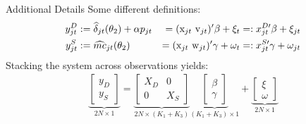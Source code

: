 \documentclass[aspectratio=169,10pt]{beamer}
\begin{document}
\begin{frame}{Additional Details}
Some different definitions:
\begin{alignat}{3}
\label{eq:stacked}
\nonumber y_{jt}^D &:= \widehat \delta_{jt}(\theta_2) + \alpha p_{jt} &=(\textrm{x}_{jt} \-\ \textrm{v}_{jt})' \beta + \xi_t &=: x_{jt}^{D\prime}\beta + \xi_{jt} \\ 
y_{jt}^S &:= \widehat{mc}_{jt}(\theta_2) &= (\textrm{x}_{jt} \-\ \textrm{w}_{jt})'\gamma + \omega_t &=: x_{jt}^{S\prime} \gamma + \omega_{jt} 
\end{alignat}
Stacking the system across observations yields:
\begin{align}
\underbrace{\begin{bmatrix} y_D \\ y_S \end{bmatrix}}_{2N\times1} = 
\underbrace{\begin{bmatrix}
X_D & 0 \\
0 & X_S 
\end{bmatrix}}_{2N\times(K_1+K_3)}
\underbrace{\begin{bmatrix}
\beta \\ \gamma %
\end{bmatrix}}_{(K_1+K_3)\times1} + 
\underbrace{\begin{bmatrix}
\xi \\ \omega %
\end{bmatrix}}_{2N\times 1}
\end{align}
\end{frame}
\end{document}
